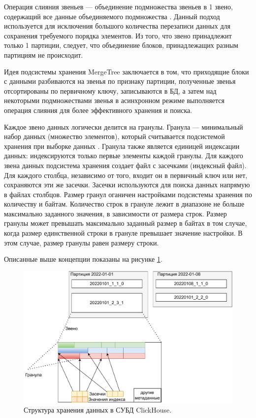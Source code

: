 Операция слияния звеньев --- объединение подмножества звеньев в 1 звено, содержащий все данные объединяемого подмножества \cite{mergetreearch}. Данный подход используется для исключения большого количества перезаписи данных для сохранения требуемого порядка элементов. Из того, что звено принадлежит только 1 партиции, следует, что объединение блоков, принадлежащих разным партициям не происходит.

Идея подсистемы хранения MergeTree заключается в том, что приходящие блоки с данными разбиваются на звенья по признаку партиции, полученные звенья отсортированы по первичному ключу, записываются в БД, а затем над некоторыми подмножествами звенья в асинхронном режиме выполняется операция слияния для более эффективного хранения и поиска.

Каждое звено данных логически делится на гранулы. Гранула --- минимальный набор данных (множество элементов), который считывается подсистемой хранения при выборке данных \cite{mergetreearch}. Гранула также является единицей индексации данных: индексируются только первые элементы каждой гранулы. Для каждого звена данных подсистема хранения создает файл с засечками (индексный файл). Для каждого столбца, независимо от того, входит он в первичный ключ или нет, сохраняются эти же засечки. Засечки используются для поиска данных напрямую в файлах столбцов. Размер гранул оганичен настройками подсистемы хранения по количеству и байтам. Количество строк в грануле лежит в диапазоне не больше максимально заданного значения, в зависимости от размера строк. Размер гранулы может превышать максимально заданный размер в байтах в том случае, когда размер единственной строки в грануле превышает значение настройки. В этом случае, размер гранулы равен размеру строки.

Описанные выше концепции показаны на рисунке \ref{fig:clickhousebase}.

\begin{figure}[hbtp]
	\centering
	\includegraphics[width=\textwidth]{img/clickhousebase.pdf}
	\caption{Структура хранения данных в СУБД ClickHouse.}
	\label{fig:clickhousebase}
\end{figure}

